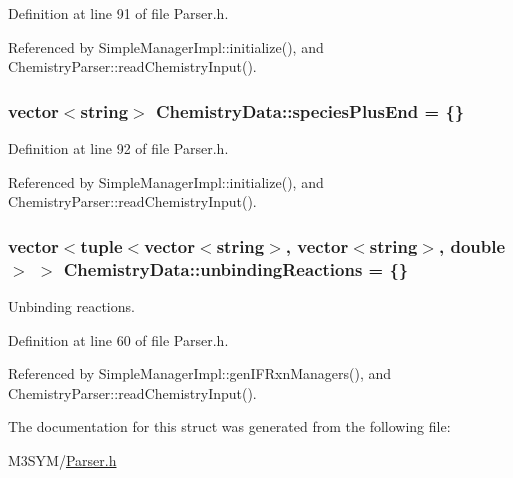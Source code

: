 Definition at line 91 of file Parser.\+h.



Referenced by Simple\+Manager\+Impl\+::initialize(), and Chemistry\+Parser\+::read\+Chemistry\+Input().

\hypertarget{structChemistryData_a627b89ad8dad87e03d249e5dc56eff5a}{
\subsubsection[{species\+Plus\+End}]{\setlength{\rightskip}{0pt plus 5cm}vector$<$string$>$ Chemistry\+Data\+::species\+Plus\+End = \{\}}}\label{structChemistryData_a627b89ad8dad87e03d249e5dc56eff5a}


Definition at line 92 of file Parser.\+h.



Referenced by Simple\+Manager\+Impl\+::initialize(), and Chemistry\+Parser\+::read\+Chemistry\+Input().

\hypertarget{structChemistryData_a0509ae76d9f3eef9f676c4c8fbab17e7}{
\subsubsection[{unbinding\+Reactions}]{\setlength{\rightskip}{0pt plus 5cm}vector$<$tuple$<$vector$<$string$>$, vector$<$string$>$, double$>$ $>$ Chemistry\+Data\+::unbinding\+Reactions = \{\}}}\label{structChemistryData_a0509ae76d9f3eef9f676c4c8fbab17e7}


Unbinding reactions. 



Definition at line 60 of file Parser.\+h.



Referenced by Simple\+Manager\+Impl\+::gen\+I\+F\+Rxn\+Managers(), and Chemistry\+Parser\+::read\+Chemistry\+Input().



The documentation for this struct was generated from the following file\+:\begin{DoxyCompactItemize}
\item 
M3\+S\+Y\+M/\hyperlink{Parser_8h}{Parser.\+h}\end{DoxyCompactItemize}

